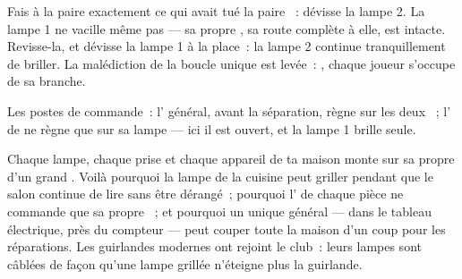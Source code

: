 \begin{example}\label{ex:g5:series-parallel-circuits:test}
Fais à la paire  exactement ce qui avait tué la paire ~: dévisse la lampe 2. La lampe 1 ne vacille même pas --- sa
propre , sa route complète à elle, est intacte. Revisse-la, et
dévisse la lampe 1 à la place~: la lampe 2 continue tranquillement de
briller. La malédiction de la boucle unique est levée~: , chaque joueur s'occupe de sa branche.
\end{example}

\begin{omfigure}

{\small Les postes de commande~: l' général, avant la
séparation, règne sur les deux ~; l' de 
ne règne que sur sa lampe --- ici il est ouvert, et la lampe 1 brille
seule.}
\end{omfigure}

\begin{example}\label{ex:g5:series-parallel-circuits:house}
Chaque lampe, chaque prise et chaque appareil de ta maison monte sur
sa propre  d'un grand . Voilà pourquoi la
lampe de la cuisine peut griller pendant que le salon continue de
lire sans être dérangé~; pourquoi l' de chaque pièce ne
commande que sa propre ~; et pourquoi un unique 
général --- dans le tableau électrique, près du compteur --- peut
couper toute la maison d'un coup pour les réparations. Les guirlandes
modernes ont rejoint le club~: leurs lampes sont câblées de façon
qu'une lampe grillée n'éteigne plus la guirlande.
\end{example}

